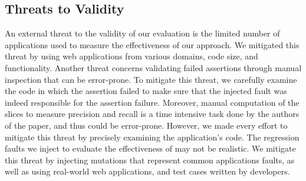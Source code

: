 \subsection{Threats to Validity} \label{Sec:threatsToValidity}
An external threat to the validity of our evaluation is the limited number of \javascript applications used to measure the effectiveness of our approach. We mitigated this threat by using web applications from various domains, code size, and functionality. Another threat concerns validating failed assertions through manual inspection that can be error-prone. To mitigate this threat, we carefully examine the code in which the assertion failed to make sure that the injected fault was indeed responsible for the assertion failure. Moreover, manual computation of the \javascript slices to measure precision and recall is a time intensive task done by the authors of the paper, and thus could be error-prone. However, we made every effort to mitigate this threat by precisely examining the application's code.
The regression faults we inject to evaluate the effectiveness of \tool may not be realistic. We mitigate this threat by injecting mutations that represent common \javascript applications faults, as well as using real-world web applications, and \selenium test cases written by developers.